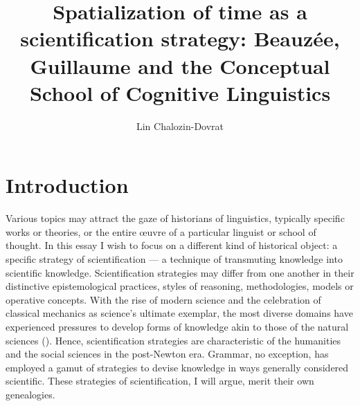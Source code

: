 \documentclass[output=paper]{langsci/langscibook}
\author{Lin Chalozin-Dovrat\affiliation{Cohn Institute for the History and Philosophy of Science and Ideas, Tel Aviv University}\orcid{}}
\title{Spatialization of time as a scientification strategy:\newlineCover{}
Beauzée, Guillaume and the Conceptual School of Cognitive Linguistics}
\begin{document}
\maketitle

\section{Introduction} 
Various topics may attract the gaze of historians of linguistics, typically specific works or theories, or the entire œuvre of a particular linguist or school of thought. In this essay I wish to focus on a different kind of historical object: a specific strategy of scientification — a technique of transmuting knowledge into scientific knowledge. Scientification strategies may differ from one another in their distinctive epistemological practices, styles of reasoning, methodologies, models or operative concepts. With the rise of modern science and the celebration of classical mechanics as science’s ultimate exemplar, the most diverse domains have experienced pressures to develop forms of knowledge akin to those of the natural sciences (\citealt{bod_making_2014}). Hence, scientification strategies are characteristic of the humanities and the social sciences in the post-Newton era. Grammar, no exception, has employed a gamut of strategies to devise knowledge in ways generally considered scientific. These strategies of scientification, I will argue, merit their own genealogies.
\end{document}

